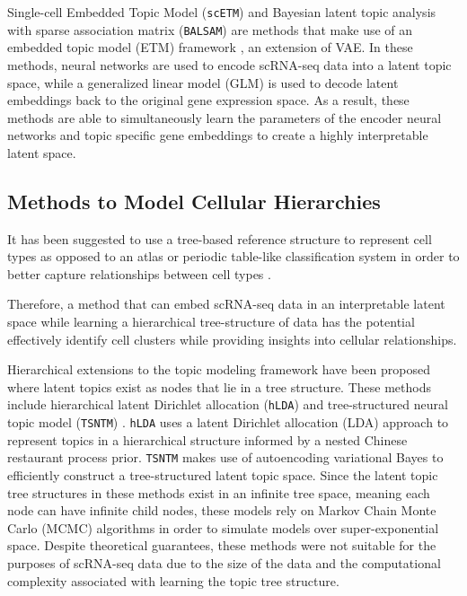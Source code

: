 Single-cell Embedded Topic Model (\texttt{scETM}) \cite{scETM} and Bayesian latent topic analysis with sparse association matrix (\texttt{BALSAM}) \cite{ZHANG2023100388}  are methods that make use of an embedded topic model (ETM) framework \cite{etm1}, an extension of VAE. In these methods, neural networks are used to encode scRNA-seq data into a latent topic space, while a generalized linear model (GLM) is used to decode latent embeddings back to the original gene expression space. As a result, these methods are able to simultaneously learn the parameters of the encoder neural networks and topic specific gene embeddings to create a highly interpretable latent space. 

\subsection{Methods to Model Cellular Hierarchies}

It has been suggested to use a tree-based reference structure to represent cell types as opposed to an atlas or periodic table-like classification system in order to better capture relationships between cell types \cite{treeref}. 

Therefore, a method that can embed scRNA-seq data in an interpretable latent space while learning a hierarchical tree-structure of data has the potential effectively identify cell clusters while providing insights into cellular relationships.

Hierarchical extensions to the topic modeling framework have been proposed where latent topics exist as nodes that lie in a tree structure. These methods include hierarchical latent Dirichlet allocation (\texttt{hLDA}) \cite{hlda} and tree-structured neural topic model (\texttt{TSNTM}) \cite{tree_etm}. \texttt{hLDA} uses a latent Dirichlet allocation (LDA) approach to represent topics in a hierarchical structure informed by a nested Chinese restaurant process prior. \texttt{TSNTM} makes use of autoencoding variational Bayes to efficiently construct a tree-structured latent topic space. Since the latent topic tree structures in these methods exist in an infinite tree space, meaning each node can have infinite child nodes, these models rely on Markov Chain Monte Carlo (MCMC) algorithms in order to simulate models over super-exponential space. Despite theoretical guarantees, these methods were not suitable for the purposes of scRNA-seq data due to the size of the data and the computational complexity associated with learning the topic tree structure. 

